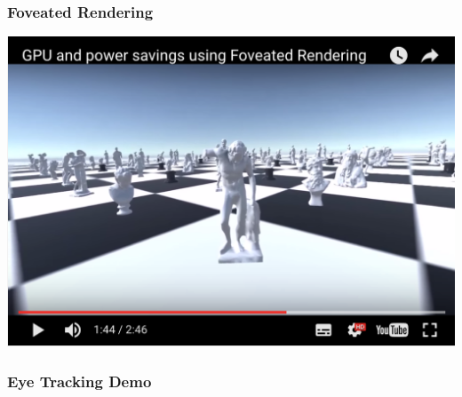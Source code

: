 \begin{frame}
	\frametitle{Foveated Rendering}
	\begin{center}
		\href{https://www.youtube.com/watch?v=6q3w0fiD0zg}{ \includegraphics[scale=.4]{assets/foveated-rendering}  }
	\end{center}
\end{frame}

\begin{frame}
	

\end{frame}


\begin{frame}
	\frametitle{Eye Tracking Demo} 
\end{frame}




